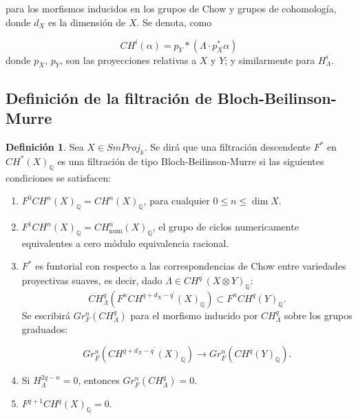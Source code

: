 \documentclass[10pt]{amsart}
\theoremstyle{definition}
\newtheorem{definition}{Definici\'on}[section]
\theoremstyle{remark}
\theoremstyle{definition}
\begin{document}
para los morfismos inducidos en los grupos de Chow y grupos de cohomolog\'ia, donde $d_{X}$ es la dimensi\'on de $X$. Se denota, como

\begin{equation*}
CH^{i}(\alpha)=p_{Y}{*}(\Lambda \cdot p^{*}_{X}\alpha)
\end{equation*}
donde $p_{X}$, $p_{Y}$, son las proyecciones relativas a $X$ y $Y$; y similarmente para $H^{i}_{\Lambda}$.

\subsection{Definición de la filtración de Bloch-Beilinson-Murre}

\begin{definition}
Sea $X \in SmProj_{\mathit{k}}$. Se dir\'a que una filtraci\'on descendente $F^{*}$ en $CH^{*}(X)_{\mathbb{Q}}$ es una filtraci\'on de tipo Bloch-Beilinson-Murre si las siguientes condiciones se satisfacen:
\begin{enumerate}
\item\label{1} $F^{0}CH^{n}(X)_{\mathbb{Q}}=CH^{n}(X)_{\mathbb{Q}}$, para cualquier $0\leq n \leq \dim X$.
\item\label{2} $F^{1}CH^{n}(X)_{\mathbb{Q}}=CH^{n}_{\mathrm{num}}(X)_{\mathbb{Q}}$, el grupo de ciclos numericamente equivalentes a cero m\'odulo equivalencia racional.
\item\label{3} $F^{*}$ es funtorial con respecto a las correspondencias de Chow entre variedades proyectivas suaves, es decir, dado $\Lambda \in CH^{q^\prime}(X \otimes Y)_{\mathbb{Q}}$:
\begin{equation*}
CH^{q}_{\Lambda}(F^{n}CH^{q+d_{X}-q^{\prime}}(X)_{\mathbb{Q}}) \subset F^{n}CH^{q}(Y)_{\mathbb{Q}}.
\end{equation*}
Se escribirá $Gr^{n}_{F}(CH^{q}_{\Lambda})$ para el morfismo inducido por $CH^{q}_{\Lambda}$ sobre los grupos graduados:

\begin{equation*}
Gr^{n}_{F}(CH^{q+d_{X}-q^{\prime}}(X)_{\mathbb{Q}}) \rightarrow Gr^{n}_{F}(CH^{q}(Y)_{\mathbb{Q}}).
\end{equation*}

 \item \label{4} Si $H^{2q-n}_{\Lambda}=0$, entonces $Gr^{n}_{F}(CH^{q}_{\Lambda})=0$.
\item  \label{5}$F^{q+1}CH^{q}(X)_{\mathbb{Q}}=0$.
\end{enumerate}
\end{definition}
\end{document}
